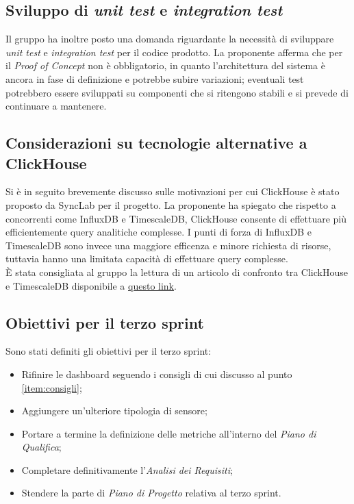 \documentclass[italian,12pt]{article}
\begin{document}
\subsection{Sviluppo di \textit{unit test} e \textit{integration test}}
Il gruppo ha inoltre posto una domanda riguardante la necessità di sviluppare \textit{unit test} e \textit{integration test} per il codice prodotto.
La proponente afferma che per il \textit{Proof of Concept} non è obbligatorio, in quanto l'architettura del sistema è ancora in fase di definizione
e potrebbe subire variazioni; eventuali test potrebbero essere sviluppati su componenti che si ritengono stabili e si prevede di continuare a mantenere.

\subsection{Considerazioni su tecnologie alternative a ClickHouse}
Si è in seguito brevemente discusso sulle motivazioni per cui ClickHouse è stato proposto da SyncLab per il progetto. La proponente ha spiegato che
rispetto a concorrenti come InfluxDB e TimescaleDB, ClickHouse consente di effettuare più efficientemente query analitiche complesse.
I punti di forza di InfluxDB e TimescaleDB sono invece una maggiore efficenza e minore richiesta di risorse, tuttavia
hanno una limitata capacità di effettuare query complesse.\\
È stata consigliata al gruppo la lettura di un articolo di confronto tra ClickHouse e TimescaleDB disponibile a \underline{\href{https://www.timescale.com/blog/what-is-clickhouse-how-does-it-compare-to-postgresql-and-timescaledb-and-how-does-it-perform-for-time-series-data/}{questo link}}.

\subsection{Obiettivi per il terzo sprint}
Sono stati definiti gli obiettivi per il terzo sprint:
\begin{itemize}
	\item Rifinire le dashboard seguendo i consigli di cui discusso al punto \ref{item:consigli};
	\item Aggiungere un'ulteriore tipologia di sensore;
	\item Portare a termine la definizione delle metriche all'interno del \textit{Piano di Qualifica};
	\item Completare definitivamente l'\textit{Analisi dei Requisiti};
	\item Stendere la parte di \textit{Piano di Progetto} relativa al terzo sprint.
\end{itemize}
\end{document}
